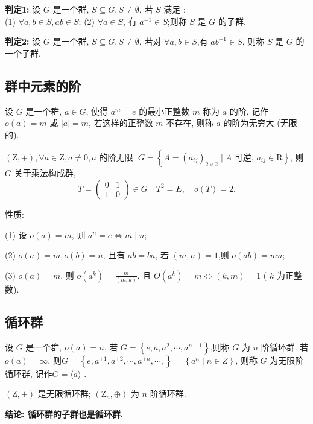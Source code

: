 \textbf{ 判定1:} 设 $ G $ 是一个群, $ S \subseteq G, S \neq \emptyset $, 若 $ S $ 满足 :\\
(1) $ \forall a, b \in S, a b \in S $;
(2) $ \forall a \in S $, 有 $ a^{-1} \in S $;则称 $ S $ 是 $ G $ 的子群.

\textbf{判定2: }设 $ G $ 是一个群, $ S \subseteq G, S \neq \emptyset $, 若对 $ \forall a, b \in S $,有 $ a b^{-1} \in S $, 则称 $ S $ 是 $ G $ 的一个子群.
\subsection{群中元素的阶}
\begin{definition}
    设 $ G $ 是一个群, $ a \in G $, 使得 $ a^{m}=e $ 的最小正整数 $ m $ 称为 $ a $ 的阶, 记作 $ o(a)=m $ 或 $ |a|=m $, 若这样的正整数 $ m $ 不存在, 则称 $ a $ 的阶为无穷大 (无限的).
\end{definition}
\begin{example}
 $ (\mathrm{Z},+), \forall a \in \mathrm{Z}, a \neq 0, a $ 的阶无限.
$ G=\left\{A=\left(a_{i j}\right)_{2 \times 2} \mid A\right. $ 可逆, $ \left.a_{i j} \in \mathrm{R}\right\} $, 则 $ G $ 关于乘法构成群,
$$
T=\left(\begin{array}{ll}
0 & 1 \\
1 & 0
\end{array}\right) \in G \quad T^{2}=E, \quad o(T)=2 .
$$
\end{example}
性质:

(1) 设 $ o(a)=m $, 则 $ a^{n}=e \Leftrightarrow m \mid n $;

(2) $ o(a)=m, o(b)=n $, 且有 $ a b=b a $, 若 $ (m, n)=1 $,则 $ o(a b)=m n $;

(3) $ o(a)=m $, 则 $ o\left(a^{k}\right)=\frac{m}{(m, k)} $,
且 $ O\left(a^{k}\right)=m \Leftrightarrow(k, m)=1 $ ( $ k $ 为正整数).

\subsection{循环群}
\begin{definition}
设 $ G $ 是一个群, $ o(a)=n $, 若 $ G=\left\{e, a, a^{2}, \cdots, a^{n-1}\right\} $,则称 $ G $ 为 $ n $ 阶循环群.
 若$o(a)  =\infty$,  则$G=\left\{e, a^{ \pm 1}, a^{ \pm 2}, \cdots, a^{ \pm n}, \cdots,\right\} =\left\{a^{n} \mid n \in Z\right\}$,  则称 $ G$ 为无限阶循环群, 记作$ G=\langle a\rangle$ .
\end{definition}
\begin{example}
     $ (\mathrm{Z},+) $ 是无限循环群; $ \left(\mathrm{Z}_{n}, \oplus\right) $ 为 $ n $ 阶循环群.
\end{example}
\textbf{结论: 循环群的子群也是循环群.}

